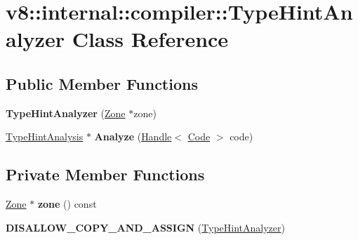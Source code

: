 \hypertarget{classv8_1_1internal_1_1compiler_1_1_type_hint_analyzer}{}\section{v8\+:\+:internal\+:\+:compiler\+:\+:Type\+Hint\+Analyzer Class Reference}
\label{classv8_1_1internal_1_1compiler_1_1_type_hint_analyzer}
\subsection*{Public Member Functions}
\begin{DoxyCompactItemize}
\item 
{\bfseries Type\+Hint\+Analyzer} (\hyperlink{classv8_1_1internal_1_1_zone}{Zone} $\ast$zone)\hypertarget{classv8_1_1internal_1_1compiler_1_1_type_hint_analyzer_a473faf778388577012ef33e49a0fa156}{}\label{classv8_1_1internal_1_1compiler_1_1_type_hint_analyzer_a473faf778388577012ef33e49a0fa156}

\item 
\hyperlink{classv8_1_1internal_1_1compiler_1_1_type_hint_analysis}{Type\+Hint\+Analysis} $\ast$ {\bfseries Analyze} (\hyperlink{classv8_1_1internal_1_1_handle}{Handle}$<$ \hyperlink{classv8_1_1internal_1_1_code}{Code} $>$ code)\hypertarget{classv8_1_1internal_1_1compiler_1_1_type_hint_analyzer_aeaab7375fd77cb4a7b4102a322a96fab}{}\label{classv8_1_1internal_1_1compiler_1_1_type_hint_analyzer_aeaab7375fd77cb4a7b4102a322a96fab}

\end{DoxyCompactItemize}
\subsection*{Private Member Functions}
\begin{DoxyCompactItemize}
\item 
\hyperlink{classv8_1_1internal_1_1_zone}{Zone} $\ast$ {\bfseries zone} () const \hypertarget{classv8_1_1internal_1_1compiler_1_1_type_hint_analyzer_abd2f1e3c82a40e9cc7cb665697cd5883}{}\label{classv8_1_1internal_1_1compiler_1_1_type_hint_analyzer_abd2f1e3c82a40e9cc7cb665697cd5883}

\item 
{\bfseries D\+I\+S\+A\+L\+L\+O\+W\+\_\+\+C\+O\+P\+Y\+\_\+\+A\+N\+D\+\_\+\+A\+S\+S\+I\+GN} (\hyperlink{classv8_1_1internal_1_1compiler_1_1_type_hint_analyzer}{Type\+Hint\+Analyzer})\hypertarget{classv8_1_1internal_1_1compiler_1_1_type_hint_analyzer_a680d1b3a76cecb2f998d5ee5c49ae4a3}{}\label{classv8_1_1internal_1_1compiler_1_1_type_hint_analyzer_a680d1b3a76cecb2f998d5ee5c49ae4a3}

\end{DoxyCompactItemize}
